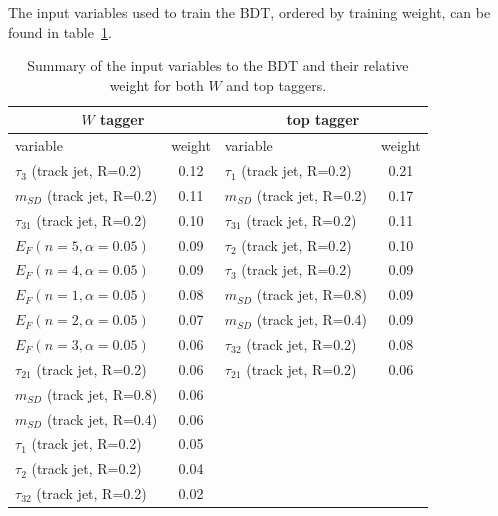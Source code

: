 \documentclass[a4paper,11pt]{article}
\newcommand*{\Zptt}{\ensuremath{Z^{\prime} \rightarrow \ttbar}}
\newcommand{\mSD}{\ensuremath{m_{\ensuremath{SD}}}}
\newcommand*{\rsg}{\ensuremath{G_{RS} \rightarrow W^+W^-}}
\newcommand*{\ttbar}{\ensuremath{t\bar{t}}}
\begin{document}
The input variables used to train the BDT, ordered by training weight, can be found in table~\ref{tab:TMVA_summary}.

\begin{table}[!htb]\centering
\begin{tabular}{| l | c | l | c |}
\hline
  \multicolumn{2}{|c|}{$W$ tagger}  & \multicolumn{2}{c|}{top tagger} \\
  \hline
 variable & weight & variable & weight \\
\hline
 $\tau_3$ (track jet, R=0.2)      & 0.12      & $\tau_1$ (track jet, R=0.2) & 0.21  \\
 $\mSD$  (track jet, R=0.2)      & 0.11      & $\mSD$  (track jet, R=0.2) & 0.17 \\
 $\tau_{31}$  (track jet, R=0.2) & 0.10     & $\tau_{31}$  (track jet, R=0.2)  & 0.11 \\
 $E_{F}(n=5,\alpha=0.05)$                               & 0.09     &  $\tau_2$ (track jet, R=0.2) & 0.10 \\
 $E_{F}(n=4,\alpha=0.05)$                               & 0.09     & $\tau_3$ (track jet, R=0.2) & 0.09 \\
 $E_{F}(n=1,\alpha=0.05)$                               & 0.08     & $\mSD$  (track jet, R=0.8)& 0.09 \\
 $E_{F}(n=2,\alpha=0.05)$                               & 0.07     &  $\mSD$  (track jet, R=0.4) & 0.09 \\
 $E_{F}(n=3,\alpha=0.05)$                               & 0.06     & $\tau_{32}$  (track jet, R=0.2) & 0.08 \\
 $\tau_{21}$  (track jet, R=0.2)& 0.06   & $\tau_{21}$  (track jet, R=0.2) & 0.06 \\
 $\mSD$  (track jet, R=0.8) & 0.06 &  &\\
 $\mSD$  (track jet, R=0.4) & 0.06 & & \\
 $\tau_1$ (track jet, R=0.2) & 0.05      &  &\\
 $\tau_2$ (track jet, R=0.2) & 0.04      &  &\\
 $\tau_{32}$  (track jet, R=0.2) & 0.02    &  &\\
\hline
\end{tabular}
\caption{Summary of the input variables to the BDT and their relative weight for both $W$ and top taggers.}
\label{tab:TMVA_summary}
\end{table}
\end{document}

